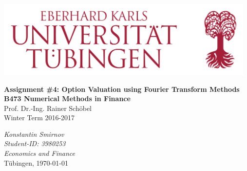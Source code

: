 \documentclass[a4paper,11pt]{article}
\begin{document}




\begin{titlepage}       %

\thispagestyle{empty}   %

\begin{center}
\includegraphics[width=13cm]{Bild.png}
\end{center}

\begin{center}

\vspace*{1.5cm}
{\bf  \Large Assignment \#4: Option Valuation using Fourier Transform Methods} \\
\vspace*{2cm} 
\textbf{B473 Numerical Methods in Finance}
\\
Prof. Dr.-Ing. Rainer Sch\"obel
\\
\vspace*{0.5cm} 
Winter Term 2016-2017\\
\end{center}

\vfill
\begin{flushright}
    \emph{Konstantin Smirnov}\\
    \textit{Student-ID: 3980253}\\
     \textit{ Economics and Finance}\\
 T\"ubingen, \today
  




\end{flushright}



% 
% 
% 

\end{titlepage}
\end{document}
